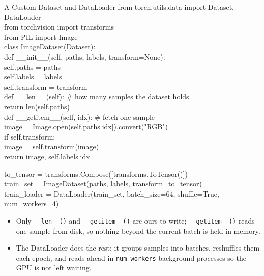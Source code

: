 \begin{frame}[allowframebreaks]{A Custom Dataset and DataLoader}
    \ttfamily\footnotesize{
    from torch.utils.data import Dataset, DataLoader \\
    from torchvision import transforms \\
    from PIL import Image \\

    class ImageDataset(Dataset): \\
    \hspace{1em}    def \_\_init\_\_(self, paths, labels, transform=None): \\
    \hspace{2em}        self.paths = paths \\
    \hspace{2em}        self.labels = labels \\
    \hspace{2em}        self.transform = transform \\

    \hspace{1em}    def \_\_len\_\_(self):  \# how many samples the dataset holds \\
    \hspace{2em}        return len(self.paths) \\

    \hspace{1em}    def \_\_getitem\_\_(self, idx):  \# fetch one sample \\
    \hspace{2em}        image = Image.open(self.paths[idx]).convert("RGB") \\
    \hspace{2em}        if self.transform: \\
    \hspace{3em}            image = self.transform(image) \\
    \hspace{2em}        return image, self.labels[idx]
    }

\framebreak
    \ttfamily\footnotesize{
    to\_tensor = transforms.Compose([transforms.ToTensor()]) \\
    train\_set = ImageDataset(paths, labels, transform=to\_tensor) \\

    train\_loader = DataLoader(train\_set, batch\_size=64, shuffle=True, \\
    \hspace{9em}          num\_workers=4)
    }
\vspace{1em}
\begin{itemize}
    \item Only \texttt{\_\_len\_\_()} and \texttt{\_\_getitem\_\_()} are ours to write; \texttt{\_\_getitem\_\_()} reads one sample from disk, so nothing beyond the current batch is held in memory.
    \item The DataLoader does the rest: it groups samples into batches, reshuffles them each epoch, and reads ahead in \texttt{num\_workers} background processes so the GPU is not left waiting.
\end{itemize}
\end{frame}
